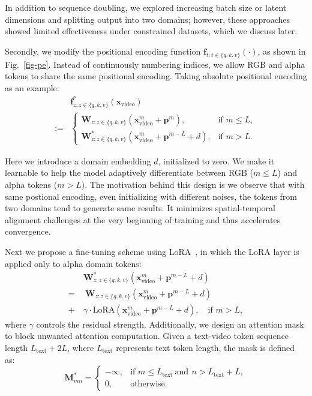 In addition to sequence doubling, we explored increasing batch size or latent dimensions and splitting output into two domains; however, these approaches showed limited effectiveness under constrained datasets, which we discuss later.

Secondly, we modify the positional encoding function \( \mathbf{f}_{t : t \in \{q, k, v\}}(\cdot) \), as shown in Fig.~\ref{fig-pe}.
Instead of continuously numbering indices, we allow RGB and alpha tokens to share the same positional encoding. 
Taking absolute positional encoding as an example:
\begin{equation}
\begin{aligned}
&\mathbf{f}^*_{z : z \in \{q, k, v\}}(\mathbf{x}_{\text{video}}) \\:=
&\begin{cases}
\mathbf{W}_{z : z \in \{q, k, v\}}(\mathbf{x}_{\text{video}}^m + \mathbf{p}^m), & \text{if } m \leq L, \\
\mathbf{W}^*_{z : z \in \{q, k, v\}}(\mathbf{x}_{\text{video}}^m + \mathbf{p}^{m-L} + d), & \text{if } m > L.
\end{cases}
\label{eq:our_pe}
\end{aligned}
\end{equation}

Here we introduce a domain embedding \( d \), initialized to zero. We make it learnable to help the model adaptively differentiate between RGB (\(m\leq L\)) and alpha tokens (\(m>L \)). 
%
The motivation behind this design is we observe that with same postional encoding, even initializing with different noises, the tokens from two domains tend to generate same results. 
It minimizes spatial-temporal alignment challenges at the very beginning of training and thus accelerates convergence.

Next we propose a fine-tuning scheme using LoRA~\cite{hu2021lora}, in which the LoRA layer is applied only to alpha domain tokens:
\begin{equation}
\begin{aligned}
&\mathbf{W}^*_{z : z \in \{q, k, v\}}(\mathbf{x}_{\text{video}}^m + \mathbf{p}^{m-L} + d)\\=
&\ \mathbf{W}_{z : z \in \{q, k, v\}}(\mathbf{x}_{\text{video}}^m + \mathbf{p}^{m-L} + d)
\\
+\ &\gamma\cdot \text{LoRA}(\mathbf{x}_{\text{video}}^m + \mathbf{p}^{m-L} + d), \quad \text{if } m > L,
\label{eq:our_lora}
\end{aligned}
\end{equation}
where \( \gamma \) controls the residual strength. 
Additionally, we design an attention mask to block unwanted attention computation. 
Given a text-video token sequence length \( L_\text{text} + 2L \), where \( L_\text{text} \) represents text token length, the mask is defined as:
\begin{equation}
\mathbf{M}^*_{mn} = 
\begin{cases} 
-\infty, & \text{if } m \leq L_\text{text} \ \text{and} \ \, n > L_\text{text} + L, \\
0, & \text{otherwise}.
\end{cases}
\label{eq:attn_mask}
\end{equation}

